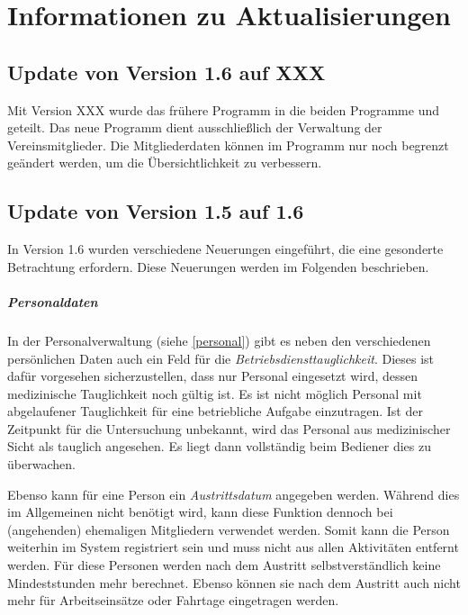 \chapter{Informationen zu Aktualisierungen}\label{sonstiges}
\section{Update von Version 1.6 auf XXX}
Mit Version XXX wurde das frühere Programm \Einsatz in die beiden Programme \Einsatz und \Personal geteilt.
Das neue Programm \Personal dient ausschließlich der Verwaltung der Vereinsmitglieder.
Die Mitgliederdaten können im Programm \Einsatz nur noch begrenzt geändert werden, um die Übersichtlichkeit zu verbessern.



\section{Update von Version 1.5 auf 1.6}
\label{sonstiges:1.5-1.6}
In Version 1.6 wurden verschiedene Neuerungen eingeführt, die eine gesonderte Betrachtung erfordern.
Diese Neuerungen werden im Folgenden beschrieben.


\paragraph{Personaldaten}
In der Personalverwaltung (siehe \cref{personal}) gibt es neben den verschiedenen persönlichen Daten auch ein Feld für die \emph{Betriebsdiensttauglichkeit}.
Dieses ist dafür vorgesehen sicherzustellen, dass nur Personal eingesetzt wird, dessen medizinische Tauglichkeit noch gültig ist.
Es ist nicht möglich Personal mit abgelaufener Tauglichkeit für eine betriebliche Aufgabe einzutragen.
Ist der Zeitpunkt für die Untersuchung unbekannt, wird das Personal aus medizinischer Sicht als tauglich angesehen.
Es liegt dann vollständig beim Bediener dies zu überwachen.

Ebenso kann für eine Person ein \emph{Austrittsdatum} angegeben werden.
Während dies im Allgemeinen nicht benötigt wird, kann diese Funktion dennoch bei (angehenden) ehemaligen Mitgliedern verwendet werden.
Somit kann die Person weiterhin im System registriert sein und muss nicht aus allen Aktivitäten entfernt werden.
Für diese Personen werden nach dem Austritt selbstverständlich keine Mindeststunden mehr berechnet.
Ebenso können sie nach dem Austritt auch nicht mehr für Arbeitseinsätze oder Fahrtage eingetragen werden.


